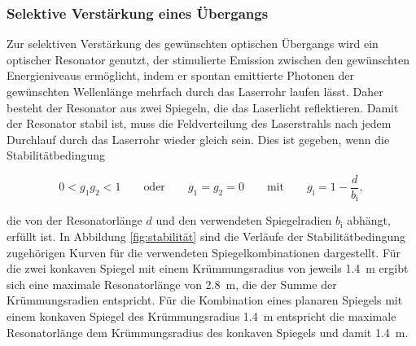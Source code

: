         \subsubsection{Selektive Verstärkung eines Übergangs}
            Zur selektiven Verstärkung des gewünschten optischen Übergangs wird ein optischer Resonator genutzt, der stimulierte Emission zwischen den gewünschten Energieniveaus ermöglicht, indem er spontan
            emittierte Photonen der gewünschten Wellenlänge mehrfach durch das Laserrohr laufen lässt. Daher besteht der Resonator aus zwei Spiegeln, die das Laserlicht reflektieren. Damit der Resonator stabil 
            ist, muss die Feldverteilung des Laserstrahls nach jedem Durchlauf durch das Laserrohr wieder gleich sein. Dies ist gegeben, wenn die Stabilitätbedingung
            
            \begin{equation*}
                0 < g_1g_2 < 1 \qquad \text{oder} \qquad g_1=g_2=0 \qquad \text{mit} \qquad g_{\text{i}} = 1 - \frac{d}{b_{\text{i}}},
                \label{eqn:Stabilitätsbedingung}
            \end{equation*}

            die von der Resonatorlänge $d$ und den verwendeten Spiegelradien $b_{\text{i}}$ abhängt, erfüllt ist. In Abbildung \ref{fig:stabilität} sind die Verläufe der Stabilitätbedingung zugehörigen Kurven 
            für die verwendeten Spiegelkombinationen dargestellt. Für die zwei konkaven Spiegel mit einem Krümmungsradius von jeweils \SI{1.4}{\metre} ergibt sich eine maximale Resonatorlänge von 
            \SI{2.8}{\metre}, die der Summe der Krümmungsradien entspricht. Für die Kombination eines planaren Spiegels mit einem konkaven Spiegel des Krümmungsradius \SI{1.4}{\metre} entspricht die maximale 
            Resonatorlänge dem Krümmungsradius des konkaven Spiegels und damit \SI{1.4}{\metre}.
            
